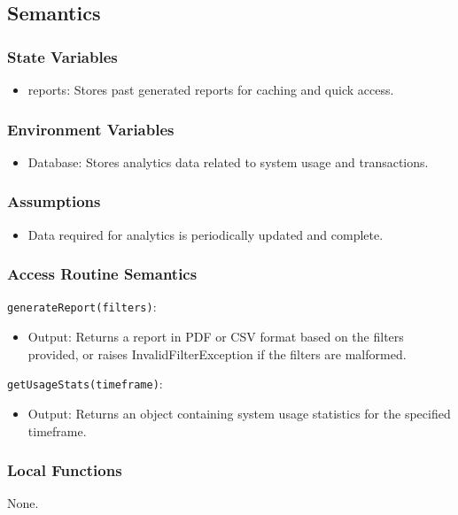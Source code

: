 \documentclass[12pt, titlepage]{article}
\begin{document}
\subsection{Semantics}
\subsubsection{State Variables}
\begin{itemize}
    \item reports: Stores past generated reports for caching and quick access.
\end{itemize}

\subsubsection{Environment Variables}
\begin{itemize}
    \item Database: Stores analytics data related to system usage and transactions.
\end{itemize}

\subsubsection{Assumptions}
\begin{itemize}
    \item Data required for analytics is periodically updated and complete.
\end{itemize}

\subsubsection{Access Routine Semantics}
\noindent \texttt{generateReport(filters)}:
\begin{itemize}
    \item Output: Returns a report in PDF or CSV format based on the filters provided, or raises InvalidFilterException if the filters are malformed.
\end{itemize}

\noindent \texttt{getUsageStats(timeframe)}:
\begin{itemize}
    \item Output: Returns an object containing system usage statistics for the specified timeframe.
\end{itemize}

\subsubsection{Local Functions}
None.
\end{document}
